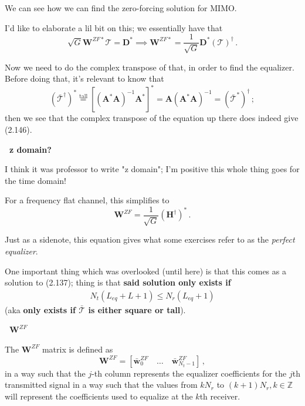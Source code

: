 \documentclass[a4paper, 12pt]{book}
\begin{document}
We can see how we can find the zero-forcing solution for MIMO.

I'd like to elaborate a lil bit on this; we essentially have that
\[
\sqrt{G} \mathbf{W}^{ZF*} \mathcal{T} = \mathbf{D}^* \implies \mathbf{W}^{ZF*} = \frac{1}{\sqrt{G}} \mathbf{D}^* (\mathcal{T})^\dagger \,.
\]


Now we need to do the complex transpose of that, in order to find the equalizer.\\
Before doing that, it's relevant to know that
\[
(\bar{\mathcal{T}}^\dagger)^* \overset{\text{tall}}{=} [(\boldsymbol{A}^*\boldsymbol{A})^{-1}\boldsymbol{A}^*]^* = \boldsymbol{A}(\boldsymbol{A}^*\boldsymbol{A})^{-1} = (\bar{\mathcal{T}}^*)^{\dagger} \,;
\]
then we see that the complex transpose of the equation up there does indeed give (2.146).

\vspace{1em}
\noindent
\colorbox{obsidianPurple}{%
    \begin{minipage}{\dimexpr\linewidth-2\fboxsep}
    \textcolor{obsidianTextPurple}{\textbf{\faQuestionCircle\ z domain?}}
    
    I think it was professor to write "z domain"; I'm positive this whole thing goes for the time domain!
    \end{minipage}%
}
\vspace{1em}

For a frequency flat channel, this simplifies to
\[ \mathbf{W}^{ZF} = \frac{1}{\sqrt{G}} (\mathbf{H}^{\dagger})^* \,. \]

\vspace{1em}
\noindent
\colorbox{obsidianGreen}{%
    \begin{minipage}{\dimexpr\linewidth-2\fboxsep}
    Just as a sidenote, this equation gives what some exercises refer to as the \textit{perfect equalizer}.
    \end{minipage}%
}
\vspace{1em}

One important thing which was overlooked (until here) is that this comes as a solution to (2.137); thing is that \textbf{said solution only exists if}
\begin{align}
    N_t(L_{eq} + L + 1) \leq N_r(L_{eq} + 1) \tag{2.146+}
\end{align}
(aka \textbf{only exists if $\bar{\mathcal{T}}$ is either square or tall}).

\vspace{1em}
\noindent
\colorbox{obsidianBlue}{%
    \begin{minipage}{\dimexpr\linewidth-2\fboxsep}
    \textcolor{obsidianTextBlue}{\textbf{\faAtom\ $\mathbf{W}^{ZF}$}}
    
    The $\mathbf{W}^{ZF}$ matrix is defined as
    \[ \mathbf{W}^{ZF} = [\bar{\mathbf{w}}_0^{ZF} \quad \dots \quad \bar{\mathbf{w}}_{N_t-1}^{ZF}] \,, \]
    in a way such that the $j$-th column represents the equalizer coefficients for the $j$th transmitted signal in a way such that the values from $kN_r$ to $(k+1)N_r, k \in \mathbb{Z}$ will represent the coefficients used to equalize at the $k$th receiver.
    \end{minipage}%
}
\end{document}
